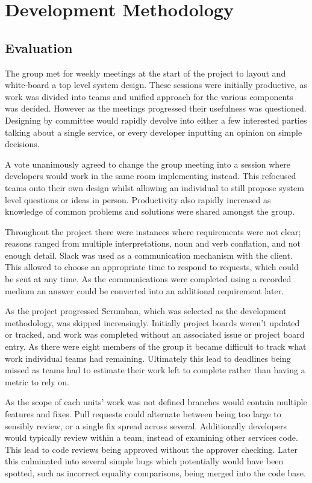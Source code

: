 \section{Development Methodology}
\subsection{Evaluation}
\par
The group met for weekly meetings at the start of the project to layout and white-board a top level system design. These sessions were initially productive, as work was divided into teams and unified approach for the various components was decided. However as the meetings progressed their usefulness was questioned. Designing by committee would rapidly devolve into either a few interested parties talking about a single service, or every developer inputting an opinion on simple decisions.

\par
A vote unanimously agreed to change the group meeting into a session where developers would work in the same room implementing instead. This refocused teams onto their own design whilst allowing an individual to still propose system level questions or ideas in person. Productivity also rapidly increased as knowledge of common problems and solutions were shared amongst the group.

\par
Throughout the project there were instances where requirements were not clear; reasons ranged from multiple interpretations, noun and verb conflation, and not enough detail. Slack was used as a communication mechanism with the client. This allowed to choose an appropriate time to respond to requests, which could be sent at any time. As the communications were completed using a recorded medium an answer could be converted into an additional requirement later.

\par
As the project progressed Scrumban, which was selected as the development methodology, was skipped increasingly. Initially project boards weren't updated or tracked, and work was completed without an associated issue or project board entry. As there were eight members of the group it became difficult to track what work individual teams had remaining. Ultimately this lead to deadlines being missed as teams had to estimate their work left to complete rather than having a metric to rely on.

\par
As the scope of each units' work was not defined branches would contain multiple features and fixes. Pull requests could alternate between being too large to sensibly review, or a single fix spread across several. Additionally developers would typically review within a team, instead of examining other services code. This lead to code reviews being approved without the approver checking. Later this culminated into several simple bugs which potentially would have been spotted, such as incorrect equality comparisons, being merged into the code base.

